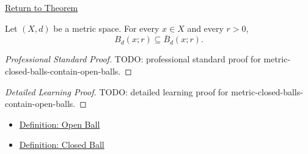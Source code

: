 \newpage
{}
\label{prf:metric-closed-balls-contain-open-balls}

\begin{remark*}[Return]
\hyperref[thm:metric-closed-balls-contain-open-balls]{Return to Theorem}
\end{remark*}

\begin{theorem*}
Let \((X,d)\) be a metric space.  For every \(x\in X\) and every \(r>0\),
\[
  B_d(x;r)\subseteq \overline{B}_d(x;r).
\]
\end{theorem*}

\begin{proof}[Professional Standard Proof]
\LRAProofBodyStart
TODO: professional standard proof for metric-closed-balls-contain-open-balls.
\end{proof}

\begin{proof}[Detailed Learning Proof]
\LRAProofBodyStart
TODO: detailed learning proof for metric-closed-balls-contain-open-balls.
\end{proof}

\begin{remark*}
\end{remark*}

\begin{dependencies}
\begin{itemize}
  \item \hyperref[def:metric-open-ball]{Definition: Open Ball}
  \item \hyperref[def:metric-closed-ball]{Definition: Closed Ball}
\end{itemize}
\end{dependencies}

\clearpage
